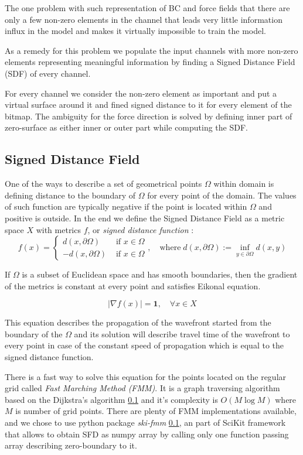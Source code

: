 The one problem with such representation of BC and force fields that there are only a few non-zero elements in the channel that leads very little information influx in the model and makes it virtually impossible to train the model.
\medskip

As a remedy for this problem we populate the input channels with more non-zero elements representing meaningful information by finding a Signed Distance Field (SDF) of every channel.
\medskip

For every channel we consider the non-zero element as important and put a virtual surface around it and fined signed distance to it for every element of the bitmap.
The ambiguity for the force direction is solved by defining inner part of zero-surface as either inner or outer part while computing the SDF.

\subsection{Signed Distance Field}

One of the ways to describe a set of geometrical points $\Omega$ within domain is defining distance to the boundary of $\Omega$ for every point of the domain. 
The values of such function are typically negative if the point is located within $\Omega$ and positive is outside.
In the end we define the Signed Distance Field as a metric space $X$ with metrics $f$, or \textit{signed distance function} :    
\[ 
f(x) = 
	\begin{cases}
			d(x, \partial \Omega) & \mbox{ if } x\in\Omega  \\
			-d(x, \partial \Omega) & \mbox{ if } x\in\Omega 
	\end{cases} 
	, \quad \mathrm{where} \; d(x, \partial \Omega) := \inf_{y \in \partial \Omega}d(x, y)
\]

If $\Omega$ is a subset of Euclidean space and has smooth boundaries, then the gradient of the metrics is constant at every point and satisfies Eikonal equation.

\[
 |\nabla f(x)| = \mathbf{1}, \quad \forall x \in X
\]

This equation describes the propagation of the wavefront started from the boundary of the $\Omega$ and its solution will describe travel time of the wavefront to every point in case of the constant speed of propagation which is equal to the signed distance function.
\medskip

There is a fast way to solve this equation for the points located on the regular grid called \textit{Fast Marching Method (FMM)}.
It is a graph traversing algorithm based on the Dijkstra's algorithm \ref{} and it's complexity is $O(M \log M)$ where $M$ is number of grid points.
There are plenty of FMM implementations available, and we chose to use python package \textit{ski-fmm} \ref{}, an part of SciKit framework that allows to obtain SFD as numpy array by calling only one function passing array describing zero-boundary to it.
\medskip

